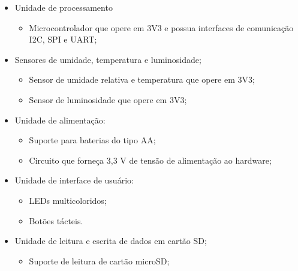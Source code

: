 \begin{itemize}
 
 \item Unidade de processamento
     \begin{itemize}
         \item Microcontrolador que opere em 3V3 e possua interfaces de comunicação \gls{I2C}, \gls{SPI} e \gls{UART};
     \end{itemize}

 \item Sensores de umidade, temperatura e luminosidade; 
  \begin{itemize}
     \item Sensor de umidade relativa e temperatura que opere em 3V3;
     \item Sensor de luminosidade que opere em 3V3;
 \end{itemize}
 
 \item Unidade de alimentação:
     \begin{itemize}
         \item Suporte para baterias do tipo AA;
         \item Circuito que forneça 3,3 V de tensão de alimentação ao hardware;
    \end{itemize} 

\item Unidade de interface de usuário: 

    \begin{itemize}
        \item LEDs multicoloridos;
        \item Botões tácteis.
    \end{itemize}
 
 \item Unidade de leitura e escrita de dados em cartão SD;
     \begin{itemize}
         \item Suporte de leitura de cartão microSD;
     \end{itemize}
\end{itemize}

